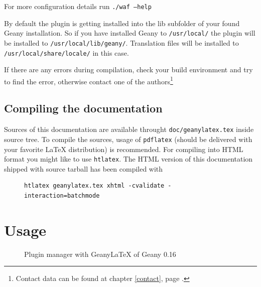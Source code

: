 \documentclass[%
paper=a4,%
fontsize=11pt,%
twoside=false,%
DIV18,
headsepline,
plainheadsepline,
footsepline,
plainfootsepline,
bibliography=totoc,%
listof=totoc,%
BCOR10mm,%
parskip=half,%
openany,%
]{scrartcl}
\begin{document}
For more configuration details run \texttt{./waf --help}

By default the plugin is getting installed into the lib subfolder of
your found Geany installation. So if you have installed Geany to
\texttt{/usr/local/} the plugin will be installed to
\texttt{/usr/local/lib/geany/}. Translation files will be installed to
\texttt{/usr/local/share/locale/} in this case.

If there are any errors during compilation, check your build environment
and try to find the error, otherwise contact one of the
authors\footnote{Contact data can be found at chapter \ref{contact},
page \pageref{contact}.}

\subsection{Compiling the documentation}
\label{sec:compiling_of_documentation}
Sources of this documentation are available throught
\texttt{doc/geanylatex.tex} inside source tree. To compile the sources,
usage of \texttt{pdflatex} (should be delivered with your favorite
\LaTeX{} distribution) is recommended. For compiling into HTML format you
might like to use \texttt{htlatex}. The HTML version of this documentation
shipped with source tarball has been compiled with

\begin{figure}[h!]
\begin{lstlisting}
htlatex geanylatex.tex xhtml -cvalidate -interaction=batchmode
\end{lstlisting}
\end{figure}

\section{Usage}
\begin{figure}[h!]
	\caption{Plugin manager with Geany\LaTeX{} of Geany 0.16}
\end{figure}
\end{document}
